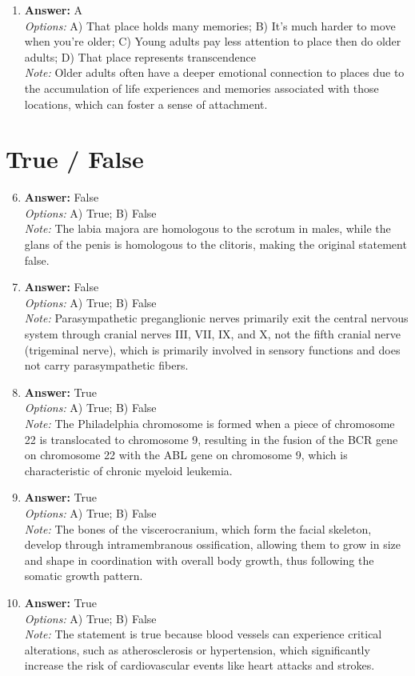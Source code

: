 \documentclass[12pt]{article}
\begin{document}
\begin{enumerate}[label=\arabic*.]
\item \textbf{Answer:} A
\\ \textit{Options:} A) That place holds many memories; B) It's much harder to move when you're older; C) Young adults pay less attention to place then do older adults; D) That place represents transcendence
\\ \textit{Note:} Older adults often have a deeper emotional connection to places due to the accumulation of life experiences and memories associated with those locations, which can foster a sense of attachment.
\end{enumerate}

\section*{True / False}
\begin{enumerate}[label=\arabic*.]
\setcounter{enumi}{5}
\item \textbf{Answer:} False
\\ \textit{Options:} A) True; B) False
\\ \textit{Note:} The labia majora are homologous to the scrotum in males, while the glans of the penis is homologous to the clitoris, making the original statement false.
\item \textbf{Answer:} False
\\ \textit{Options:} A) True; B) False
\\ \textit{Note:} Parasympathetic preganglionic nerves primarily exit the central nervous system through cranial nerves III, VII, IX, and X, not the fifth cranial nerve (trigeminal nerve), which is primarily involved in sensory functions and does not carry parasympathetic fibers.
\item \textbf{Answer:} True
\\ \textit{Options:} A) True; B) False
\\ \textit{Note:} The Philadelphia chromosome is formed when a piece of chromosome 22 is translocated to chromosome 9, resulting in the fusion of the BCR gene on chromosome 22 with the ABL gene on chromosome 9, which is characteristic of chronic myeloid leukemia.
\item \textbf{Answer:} True
\\ \textit{Options:} A) True; B) False
\\ \textit{Note:} The bones of the viscerocranium, which form the facial skeleton, develop through intramembranous ossification, allowing them to grow in size and shape in coordination with overall body growth, thus following the somatic growth pattern.
\item \textbf{Answer:} True
\\ \textit{Options:} A) True; B) False
\\ \textit{Note:} The statement is true because blood vessels can experience critical alterations, such as atherosclerosis or hypertension, which significantly increase the risk of cardiovascular events like heart attacks and strokes.
\end{enumerate}
\end{document}
